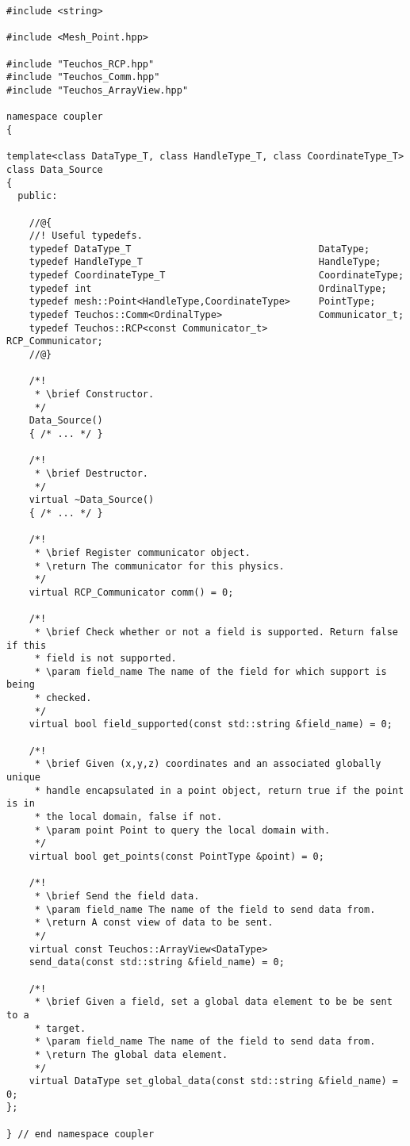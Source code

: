 \documentclass[letterpaper]{article}
\begin{document}
\begin{lstlisting}
#include <string>

#include <Mesh_Point.hpp>

#include "Teuchos_RCP.hpp"
#include "Teuchos_Comm.hpp"
#include "Teuchos_ArrayView.hpp"

namespace coupler
{

template<class DataType_T, class HandleType_T, class CoordinateType_T>
class Data_Source 
{
  public:

    //@{
    //! Useful typedefs.
    typedef DataType_T                                 DataType;
    typedef HandleType_T                               HandleType;
    typedef CoordinateType_T                           CoordinateType;
    typedef int                                        OrdinalType;
    typedef mesh::Point<HandleType,CoordinateType>     PointType;
    typedef Teuchos::Comm<OrdinalType>                 Communicator_t;
    typedef Teuchos::RCP<const Communicator_t>         RCP_Communicator;
    //@}

    /*!
     * \brief Constructor.
     */
    Data_Source()
    { /* ... */ }

    /*!
     * \brief Destructor.
     */
    virtual ~Data_Source()
    { /* ... */ }

    /*!
     * \brief Register communicator object.
     * \return The communicator for this physics.
     */
    virtual RCP_Communicator comm() = 0;

    /*!
     * \brief Check whether or not a field is supported. Return false if this
     * field is not supported. 
     * \param field_name The name of the field for which support is being
     * checked.
     */
    virtual bool field_supported(const std::string &field_name) = 0;

    /*! 
     * \brief Given (x,y,z) coordinates and an associated globally unique
     * handle encapsulated in a point object, return true if the point is in
     * the local domain, false if not. 
     * \param point Point to query the local domain with.
     */
    virtual bool get_points(const PointType &point) = 0;

    /*! 
     * \brief Send the field data.
     * \param field_name The name of the field to send data from.
     * \return A const view of data to be sent.
     */
    virtual const Teuchos::ArrayView<DataType> 
    send_data(const std::string &field_name) = 0;

    /*!
     * \brief Given a field, set a global data element to be be sent to a
     * target.
     * \param field_name The name of the field to send data from.
     * \return The global data element.
     */
    virtual DataType set_global_data(const std::string &field_name) = 0;
};

} // end namespace coupler
\end{lstlisting}
\end{document}
